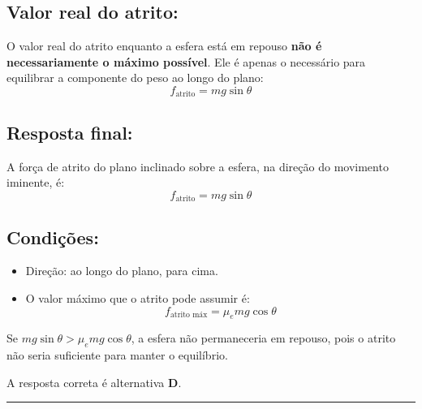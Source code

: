 \documentclass[a4paper,12pt]{article}
\begin{document}
\begin{flushleft}
\subsection*{Valor real do atrito:}

O valor real do atrito enquanto a esfera está em repouso \textbf{não é necessariamente o máximo possível}.  
Ele é apenas o necessário para equilibrar a componente do peso ao longo do plano:
\begin{equation*}
  f_{\text{atrito}} = mg \sin\theta
\end{equation*}

\subsection*{Resposta final:}

A força de atrito do plano inclinado sobre a esfera, na direção do movimento iminente, é:
\begin{equation*}
  \boxed{f_{\text{atrito}} = mg \sin\theta}
\end{equation*}

\subsection*{Condições:}

\begin{itemize}
  \item Direção: ao longo do plano, para cima.
  \item O valor máximo que o atrito pode assumir é:
  \begin{equation*}
    f_{\text{atrito máx}} = \mu_e mg \cos\theta
  \end{equation*}
\end{itemize}

Se \( mg\sin\theta > \mu_e mg\cos\theta \), a esfera não permaneceria em repouso, pois o atrito não seria suficiente para manter o equilíbrio.

A resposta correta é alternativa \colorbox{green!50}{\textbf{D}}.

\end{flushleft}

\noindent\rule{\linewidth}{0.6pt}\\
\end{document}
